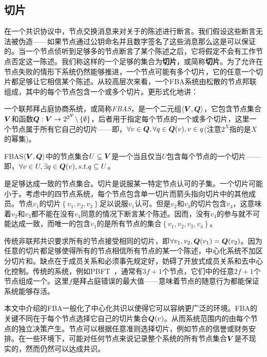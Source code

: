 \subsection{{\quorum}切片}

在一个共识协议中，节点交换消息来对关于{\slot}的陈述进行断言。我们假设这些断言无法被伪造——如果节点通过公钥命名并且数字签名了这些消息那么这是可以保证的。当一个节点侦听到足够多的节点断言了某个陈述之后，它将假定不会有工作节点否定这一陈述。我们称这样的一个足够的集合为\textbf{{\quorum}切片}，或简称\textbf{切片}。为了允许在节点失败的情形下系统仍然能够推进，一个节点可能有多个切片，它的任意一个切片都足够让它相信某个陈述。从较高层次来看，一个FBA系统由松散的节点邦联组成，其中的每个节点包含一个或多个切片。更形式化地讲：

\begin{definition}[FBAS]
	一个联邦拜占庭协商系统，或简称\textit{FBAS}，是一个二元组$\langle{\bm V}, {\bm Q}\rangle$，它包含节点集合${\bm V}$和{\quorum}函数${\bm Q}:{\bm V}\rightarrow2^{2^{{\bm V}}}\backslash\left\{\emptyset\right\}$，后者用于指定每个节点的一个或多个切片，这里一个节点属于所有它自己的切片——即，$\forall v\in{\bm Q},\forall q\in{{\bm Q}(v)},v\in q$(注意$2^X$指的是$X$的幂集)。
\end{definition}

\begin{definition}[\quorum]
	FBAS$\langle{\bm V},{\bm Q}\rangle$中的节点集合$U\subseteq{\bm V}$是一个\textbf{\quorum}当且仅当$U$包含每个节点的一个切片——即，$\forall v\in U, \exists q \in {\bm Q}(v), s.t. q\subseteq U$。
\end{definition}

{\quorum}是足够达成一致的节点集合。切片是说服某一特定节点认可的{\quorum}子集。一个{\quorum}切片可能小于{\quorum}。考虑中的四节点系统，每个节点包含单一切片而箭头指向切片中的其他成员。节点$v_1$的切片$\left\{v_1,v_2,v_3\right\}$足以说服$v_1$认可。但是$v_2$和$v_3$的切片包含$v_4$，这意味着$v_2$和$v_3$都不能在没有$v_4$同意的情况下断言某个陈述。因而，没有$v_4$的参与就不可能达成一致，而唯一的包含$v_1$的{\quorum}是所有节点的集合$\left\{v_1,v_2,v_3,v_4\right\}$。

传统非联邦共识要求所有的节点接受相同的切片，即$\forall v_1, v_2, {\bm Q}(v_1)={\bm Q}(v_2)$。因为任意的切片都足够使得所有的节点相信所有节点的某一个陈述，中心化系统不加区分切片和{\quorum}。缺点在于成员关系和{\quorum}必须事先规定好，妨碍了开放式成员关系和去中心化控制。传统的系统，例如PBFT~\cite{Castro:1999:PBFT}，通常有$3f+1$个节点，它们中的任意$2f+1$个节点组成一个{\quorum}。这里$f$是拜占庭错误的最大值——意味着节点的随意行为都能保证系统能够存活。

本文中介绍的FBA一般化了中心化共识以使得它可以容纳更广泛的环境。FBA的关键不同在于每个节点选择它自己的{\quorum}切片集合${\bm Q}(v)$。从而系统范围内的{\quorum}由每个节点的独立决策产生。节点可以根据任意准则选择切片，例如节点的信誉或财务安排。在一些环境下，可能对任何节点来说记录整个系统的所有节点集合${{\bm V}}$是不现实的，然而仍然可以达成共识。